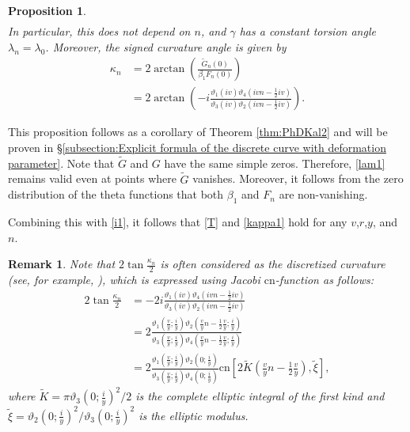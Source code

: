 \documentclass[10pt,leqno]{amsart}
\newtheorem{prop}[theorem]{Proposition}
\newtheorem{remark}[theorem]{Remark}
\numberwithin{equation}{section}
\begin{document}
\begin{prop}
\begin{equation}
\begin{split}
\end{split}
\end{equation}
In particular, this does not depend on $n$,
and $\gamma$ has a constant torsion angle
$\lambda_n=\lambda_0$.
Moreover,
the signed curvature angle is given by
\begin{equation}\label{kappa1}
\begin{split}
\kappa_{n}&=2\arctan\left(\frac{\widetilde{G}_{n}(0)}{\beta_{1} F_{n}(0)}\right)\\
&=2\arctan\left(-i\frac{\vartheta_1(iv)\vartheta_4\left(ivn-\frac{1}{2}iv\right)}{\vartheta_3(iv)\vartheta_2\left(ivn-\frac{1}{2}iv\right)}\right).
\end{split}
\end{equation}
\end{prop}
This proposition follows as a corollary of Theorem \ref{thm:PhDKal2} and will be proven in \S\ref{subsection:Explicit formula of the discrete curve with deformation parameter}.
Note that $\widetilde{G}$ and $G$ have the same simple zeros.
Therefore, \eqref{lam1} remains valid even at points where $\widetilde{G}$ vanishes.
Moreover, it follows from the zero distribution of the theta functions that both $\beta_{1}$ and $F_{n}$ are non-vanishing.

Combining this with \eqref{i1}, it follows that \eqref{T} and \eqref{kappa1} hold for any $v$,$r$,$y$, and $n$.
\begin{remark}
Note that $2\tan\frac{\kappa_{n}}{2}$ is often considered as the discretized curvature (see, for example, \cite{hoffmann2009lecture}), which is expressed using Jacobi $\mathrm{cn}$-function as follows:
\begin{equation}\label{kappa222}
\begin{split}
2\tan\frac{\kappa_{n}}{2}&=-2i\frac{\vartheta_1(iv)\vartheta_4\left(ivn-\frac{1}{2}iv\right)}{\vartheta_3(iv)\vartheta_2\left(ivn-\frac{1}{2}iv\right)}\\
&=2\frac{\vartheta_1\left(\frac{v}{y};\frac{i}{y}\right)\vartheta_2\left(\frac{v}{y}n-\frac{1}{2}\frac{v}{y};\frac{i}{y}\right)}{\vartheta_3\left(\frac{v}{y};\frac{i}{y}\right)\vartheta_4\left(\frac{v}{y}n-\frac{1}{2}\frac{v}{y};\frac{i}{y}\right)}\\
&=2\frac{\vartheta_1\left(\frac{v}{y};\frac{i}{y}\right)\vartheta_2\left(0;\frac{i}{y}\right)}{\vartheta_3\left(\frac{v}{y};\frac{i}{y}\right)\vartheta_4\left(0;\frac{i}{y}\right)}\mathrm{cn}\left[2\tilde{K}\left(\frac{v}{y}n-\frac{1}{2}\frac{v}{y}\right),\tilde{\xi}\right],
\end{split}
\end{equation}
where $\tilde{K}=\pi\vartheta_3\left(0;\frac{i}{y}\right)^2/2$ is the complete elliptic integral of the first kind and $\tilde{\xi}=\vartheta_2\left(0;\frac{i}{y}\right)^2/\vartheta_3\left(0;\frac{i}{y}\right)^2$ is the elliptic modulus.
\end{remark}
\end{document}
